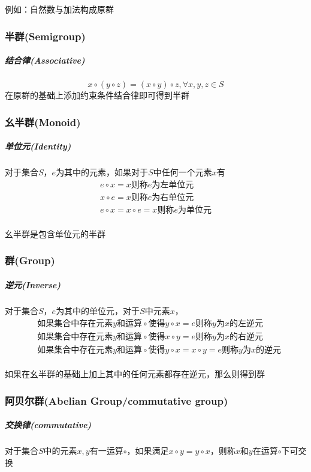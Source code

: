 \documentclass{article}
\begin{document}
\begin{CJK}{UTF8}{gkai}
例如：自然数与加法构成原群\\

\subsubsection*{半群(Semigroup)}
\subparagraph{结合律(Associative)\\}
\[x\circ (y\circ z) = (x\circ y)\circ z  ,\forall x,y,z\in S\]
在原群的基础上添加约束条件结合律即可得到半群
\subsubsection*{幺半群(Monoid)}
\subparagraph{单位元(Identity)\\}
对于集合$S$，$e$为其中的元素，如果对于$S$中任何一个元素$x$有
\[
\begin{aligned}    
e\circ x = x\text{则称}e\text{为左单位元}\\
x\circ e = x\text{则称}e\text{为右单位元}\\
e\circ x = x\circ e = x\text{则称}e\text{为单位元}\\
\end{aligned}
\]

幺半群是包含单位元的半群\\
\subsubsection*{群(Group)}
\subparagraph{逆元(Inverse)\\}

对于集合$S$，$e$为其中的单位元，对于$S$中元素$x$，
\[
\begin{aligned}  
&\text{如果集合中存在元素}y\text{和运算}\circ \text{使得}y\circ x = e\text{则称}y\text{为}x\text{的左逆元}\\
&\text{如果集合中存在元素}y\text{和运算}\circ \text{使得}x\circ y = e\text{则称}y\text{为}x\text{的右逆元}\\
&\text{如果集合中存在元素}y\text{和运算}\circ \text{使得}y\circ x =x\circ y= e\text{则称}y\text{为}x\text{的逆元}\\
\end{aligned}
\]

如果在幺半群的基础上加上其中的任何元素都存在逆元，那么则得到群\\
\subsubsection*{阿贝尔群(Abelian Group/commutative group)}
\subparagraph{交换律(commutative)\\}
对于集合$S$中的元素$x,y$有一运算$\circ$，如果满足$x \circ y = y\circ x $，则称$x$和$y$在运算$\circ$下可交换\\


\end{CJK}
\end{document}
